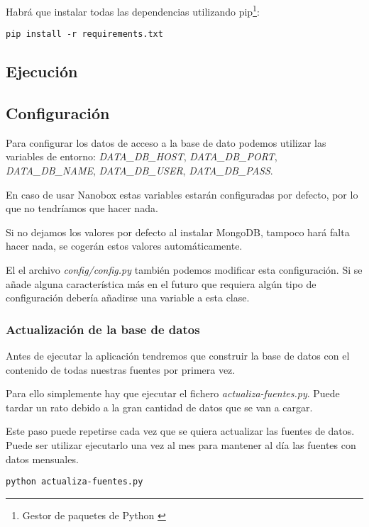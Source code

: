 Habrá que instalar todas las dependencias utilizando pip\footnote{Gestor de paquetes de Python \cite{wiki:pip}}:

\begin{lstlisting}
pip install -r requirements.txt
\end{lstlisting}

\subsection{Ejecución}

\subsection{Configuración}

Para configurar los datos de acceso a la base de dato podemos utilizar las variables de entorno: \textit{DATA\_DB\_HOST}, \textit{DATA\_DB\_PORT}, \textit{DATA\_DB\_NAME}, \textit{DATA\_DB\_USER}, \textit{DATA\_DB\_PASS}.

En caso de usar Nanobox estas variables estarán configuradas por defecto, por lo que no tendríamos que hacer nada.

Si no dejamos los valores por defecto al instalar MongoDB, tampoco hará falta hacer nada, se cogerán estos valores automáticamente.

El el archivo \textit{config/config.py} también podemos modificar esta configuración. Si se añade alguna característica más en el futuro que requiera algún tipo de configuración debería añadirse una variable a esta clase.

\subsubsection{Actualización de la base de datos}

Antes de ejecutar la aplicación tendremos que construir la base de datos con el contenido de todas nuestras fuentes por primera vez.

Para ello simplemente hay que ejecutar el fichero \textit{actualiza-fuentes.py}. Puede tardar un rato debido a la gran cantidad de datos que se van a cargar.

Este paso puede repetirse cada vez que se quiera actualizar las fuentes de datos. Puede ser utilizar ejecutarlo una vez al mes para mantener al día las fuentes con datos mensuales.

\begin{lstlisting}
python actualiza-fuentes.py
\end{lstlisting}

